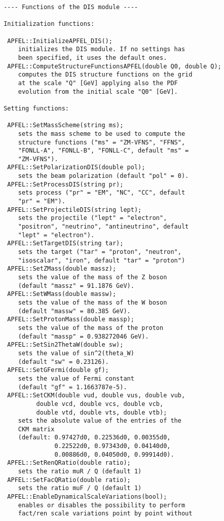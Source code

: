 \documentclass[11pt,a4paper]{article}
\begin{document}
\begin{lstlisting}
 ---- Functions of the DIS module ----
 
 Initialization functions:
 
  APFEL::InitializeAPFEL_DIS();
     initializes the DIS module. If no settings has
     been specified, it uses the default ones.
  APFEL::ComputeStructureFunctionsAPFEL(double Q0, double Q);
     computes the DIS structure functions on the grid
     at the scale "Q" [GeV] applying also the PDF
     evolution from the initial scale "Q0" [GeV].
   
 Setting functions:
 
  APFEL::SetMassScheme(string ms);
     sets the mass scheme to be used to compute the
     structure functions ("ms" = "ZM-VFNS", "FFNS",
     "FONLL-A", "FONLL-B", "FONLL-C", default "ms" =
     "ZM-VFNS").
  APFEL::SetPolarizationDIS(double pol);
     sets the beam polarization (default "pol" = 0).
  APFEL::SetProcessDIS(string pr);
     sets process ("pr" = "EM", "NC", "CC", default
     "pr" = "EM").
  APFEL::SetProjectileDIS(string lept);
     sets the projectile ("lept" = "electron",
     "positron", "neutrino", "antineutrino", default
     "lept" = "electron").
  APFEL::SetTargetDIS(string tar);
     sets the target ("tar" = "proton", "neutron",
     "isoscalar", "iron", default "tar" = "proton")
  APFEL::SetZMass(double massz);
     sets the value of the mass of the Z boson
     (default "massz" = 91.1876 GeV).
  APFEL::SetWMass(double massw);
     sets the value of the mass of the W boson
     (default "massw" = 80.385 GeV).
  APFEL::SetProtonMass(double massp);
     sets the value of the mass of the proton
     (default "massp" = 0.938272046 GeV).
  APFEL::SetSin2ThetaW(double sw);
     sets the value of sin^2(theta_W)
     (default "sw" = 0.23126).
  APFEL::SetGFermi(double gf);
     sets the value of Fermi constant
     (default "gf" = 1.1663787e-5).
  APFEL::SetCKM(double vud, double vus, double vub,
          double vcd, double vcs, double vcb,
          double vtd, double vts, double vtb);
     sets the absolute value of the entries of the
     CKM matrix
     (default: 0.97427d0, 0.22536d0, 0.00355d0,
               0.22522d0, 0.97343d0, 0.04140d0,
               0.00886d0, 0.04050d0, 0.99914d0).
  APFEL::SetRenQRatio(double ratio);
     sets the ratio muR / Q (default 1)
  APFEL::SetFacQRatio(double ratio);
     sets the ratio muF / Q (default 1)
  APFEL::EnableDynamicalScaleVariations(bool);
     enables or disables the possibility to perform
     fact/ren scale variations point by point without

\end{lstlisting}
\end{document}
